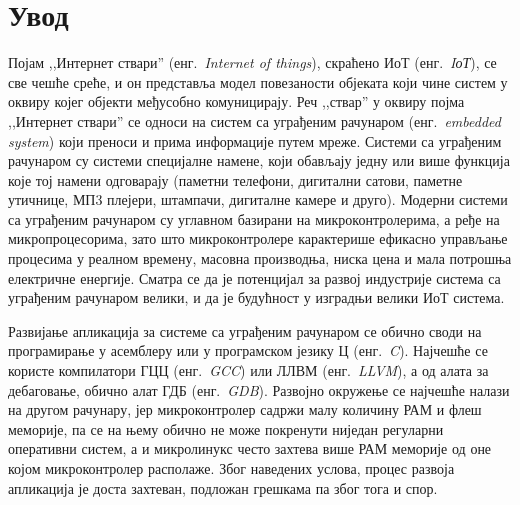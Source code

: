 \documentclass[12pt,oneside]{memoir}
\begin{document}
\frontmatter
\naslovna
\komisija
\apstrakt
\tableofcontents*

\mainmatter

\chapter{Увод}
Појам ,,Интернет ствари'' (енг.~\textit{Internet of things}), скраћено ИоТ (енг.~\textit{IоТ}), се све чешће среће, и он представља модел повезаности објеката који чине систем у оквиру којег објекти међусобно комуницирају. Реч ,,ствар'' у оквиру појма ,,Интернет ствари'' се односи на систем са уграђеним рачунаром (енг.~\textit{embedded system}) који преноси и прима информације путем мреже. Системи са уграђеним рачунаром су системи специјалне намене, који обављају једну или више функција које тој намени одговарају (паметни телефони, дигитални сатови, паметне утичнице, МП3 плејери, штампачи, дигиталне камере и друго). Модерни системи са уграђеним рачунаром су углавном базирани на микроконтролерима, а ређе на микропроцесорима, зато што микроконтролере карактерише ефикасно управљање процесима у реалном времену, масовна производња, ниска цена и мала потрошња електричне енергије. Сматра се да је потенцијал за развој индустрије система са уграђеним рачунаром велики, и да је будућност у изградњи велики ИоТ система.

Развијање апликација за системе са уграђеним рачунаром се обично своди на програмирање у асемблеру или у програмском језику Ц (енг.~\textit{C}). Најчешће се користе компилатори ГЦЦ (енг.~\textit{GCC}) или ЛЛВМ (енг.~\textit{LLVM}), а од алата за дебаговање, обично алат ГДБ (енг.~\textit{GDB}). Развојно окружење се најчешће налази на другом рачунару, јер микроконтролер садржи малу количину РАМ и флеш меморије, па се на  њему обично не може покренути ниједан регуларни оперативни систем, а и микролинукс често захтева више РАМ меморије од оне којом микроконтролер располаже. Због наведених услова, процес развоја апликација је доста захтеван, подложан грешкама па због тога и спор.
\end{document}
